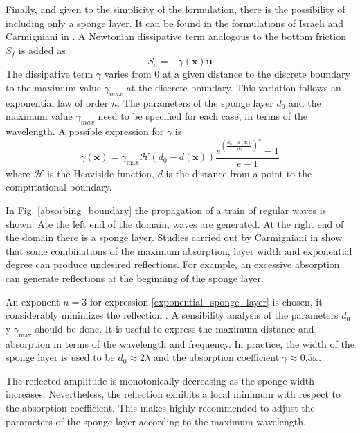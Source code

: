 Finally, and given to the simplicity of the formulation, there is the possibility of including only a sponge layer. It can be found in the formulations of Israeli and Carmigniani in \cite{israeli1981,carmigniani2018}. A Newtonian dissipative term analogous to the bottom friction $S_f$ is added as
\begin{equation}
    S_a = -\gamma(\mathbf{x}) \mathbf{u}
\end{equation}
The dissipative term $\gamma$ varies from 0 at a given distance to the discrete boundary to the maximum value $\gamma_{max}$ at the discrete boundary. This variation follows an exponential law \cite{peric2018} of order $n$. The parameters of the sponge layer $d_0$ and the maximum value $\gamma_{max}$ need to be specified for each case, in terms of the wavelength.
A possible expression for $\gamma$ is
\begin{equation} \label{exponential_sponge_layer}
    \gamma(\mathbf{x}) = \gamma_{\max} \mathcal{H}(d_0 - d(\mathbf{x})) \frac{e^{\left(\frac{d_0 - d(\mathbf{x})}{d_0}\right)^n} - 1}{e - 1}
\end{equation}
where $\mathcal{H}$ is the Heaviside function, $d$ is the distance from a point to the computational boundary.

In Fig. \ref{absorbing_boundary} the propagation of a train of regular waves is shown. Ate the left end of the domain, waves are generated. At the right end of the domain there is a sponge layer. Studies carried out by Carmigniani in \cite{carmigniani2018} show that some combinations of the maximum absorption, layer width and exponential degree can produce undesired reflections. For example, an excessive absorption can generate reflections at the beginning of the sponge layer.

An exponent $n=3$ for expression \ref{exponential_sponge_layer} is chosen, it considerably minimizes the reflection \cite{carmigniani2018}. A sensibility analysis of the parameters $d_0$ y $\gamma_{\max}$ should be done.
It is useful to express the maximum distance and absorption in terms of the wavelength and frequency. In practice, the width of the sponge layer is used to be $d_0 \approx 2\lambda$ and the absorption coefficient $\gamma \approx 0.5\omega$.

The reflected amplitude is monotonically decreasing as the sponge width increases. Nevertheless, the reflection exhibits a local minimum with respect to the absorption coefficient. This makes highly recommended to adjust the parameters of the sponge layer according to the  maximum wavelength.


